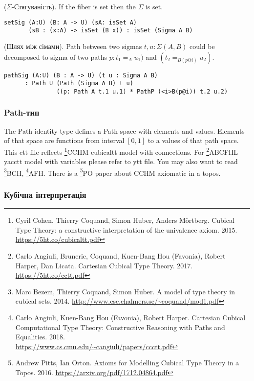 \begin{theorem} ($\Sigma$-Стягуваність). If the fiber is set then the $\Sigma$ is set.
\begin{lstlisting}
setSig (A:U) (B: A -> U) (sA: isSet A)
       (sB : (x:A) -> isSet (B x)) : isSet (Sigma A B)
\end{lstlisting}
\end{theorem}

\begin{theorem} (Шлях між сімами).
Path between two sigmas $t,u: \Sigma(A,B)$ could be decomposed to
sigma of two paths $p:t_1=_{A}u_1)$ and $(t_2=_{B(p@i)}u_2)$.
\begin{lstlisting}
pathSig (A:U) (B : A -> U) (t u : Sigma A B)
      : Path U (Path (Sigma A B) t u)
               ((p: Path A t.1 u.1) * PathP (<i>B(p@i)) t.2 u.2)
\end{lstlisting}
\end{theorem}

\newpage
\subsubsection{Path-тип}
The Path identity type defines a Path space with elements and values.
Elements of that space are functions from interval $[0,1]$ to a values of that path space.
This ctt file reflects \footnote{Cyril Cohen, Thierry Coquand, Simon Huber, Anders M{\"{o}}rtberg. Cubical Type Theory: a constructive interpretation of the univalence axiom. 2015. \url{https://5ht.co/cubicaltt.pdf}}{CCHM} cubicaltt model with connections.
For \footnote{Carlo Angiuli, Brunerie, Coquand, Kuen-Bang Hou (Favonia), Robert Harper, Dan Licata. Cartesian Cubical Type Theory. 2017. \url{https://5ht.co/cctt.pdf}}{ABCFHL} yacctt model with
variables please refer to ytt file. You may also want to
read \footnote{Marc Bezem, Thierry Coquand, Simon Huber. A model of type theory in cubical sets. 2014. \url{http://www.cse.chalmers.se/~coquand/mod1.pdf}}{BCH},
\footnote{Carlo Angiuli, Kuen-Bang Hou (Favonia), Robert Harper. Cartesian Cubical Computational Type Theory: Constructive Reasoning with Paths and Equalities. 2018. \\ \url{https://www.cs.cmu.edu/~cangiuli/papers/ccctt.pdf}}{AFH}.
There is a \footnote{Andrew Pitts, Ian Orton. Axioms for Modelling Cubical Type Theory in a Topos. 2016. \url{https://arxiv.org/pdf/1712.04864.pdf}}{PO} paper about CCHM axiomatic in a topos.

\subsubsection{Кубічна інтерпретація}

